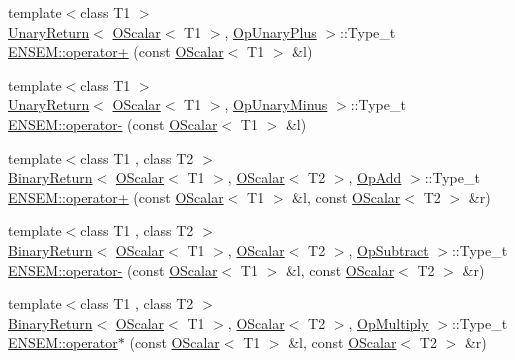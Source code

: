 \begin{DoxyCompactItemize}
\item 
{\footnotesize template$<$class T1 $>$ }\\\mbox{\hyperlink{structENSEM_1_1UnaryReturn}{Unary\+Return}}$<$ \mbox{\hyperlink{classENSEM_1_1OScalar}{O\+Scalar}}$<$ T1 $>$, \mbox{\hyperlink{structENSEM_1_1OpUnaryPlus}{Op\+Unary\+Plus}} $>$\+::Type\+\_\+t \mbox{\hyperlink{group__obsscalar_gac4378d2fcdd1b512f26ca8549d533809}{E\+N\+S\+E\+M\+::operator+}} (const \mbox{\hyperlink{classENSEM_1_1OScalar}{O\+Scalar}}$<$ T1 $>$ \&l)
\item 
{\footnotesize template$<$class T1 $>$ }\\\mbox{\hyperlink{structENSEM_1_1UnaryReturn}{Unary\+Return}}$<$ \mbox{\hyperlink{classENSEM_1_1OScalar}{O\+Scalar}}$<$ T1 $>$, \mbox{\hyperlink{structENSEM_1_1OpUnaryMinus}{Op\+Unary\+Minus}} $>$\+::Type\+\_\+t \mbox{\hyperlink{group__obsscalar_ga4bd7642a04321b074e1d5a47a9e195e4}{E\+N\+S\+E\+M\+::operator-\/}} (const \mbox{\hyperlink{classENSEM_1_1OScalar}{O\+Scalar}}$<$ T1 $>$ \&l)
\item 
{\footnotesize template$<$class T1 , class T2 $>$ }\\\mbox{\hyperlink{structENSEM_1_1BinaryReturn}{Binary\+Return}}$<$ \mbox{\hyperlink{classENSEM_1_1OScalar}{O\+Scalar}}$<$ T1 $>$, \mbox{\hyperlink{classENSEM_1_1OScalar}{O\+Scalar}}$<$ T2 $>$, \mbox{\hyperlink{structENSEM_1_1OpAdd}{Op\+Add}} $>$\+::Type\+\_\+t \mbox{\hyperlink{group__obsscalar_gad9d349126080f8e62b28694075f5dd8d}{E\+N\+S\+E\+M\+::operator+}} (const \mbox{\hyperlink{classENSEM_1_1OScalar}{O\+Scalar}}$<$ T1 $>$ \&l, const \mbox{\hyperlink{classENSEM_1_1OScalar}{O\+Scalar}}$<$ T2 $>$ \&r)
\item 
{\footnotesize template$<$class T1 , class T2 $>$ }\\\mbox{\hyperlink{structENSEM_1_1BinaryReturn}{Binary\+Return}}$<$ \mbox{\hyperlink{classENSEM_1_1OScalar}{O\+Scalar}}$<$ T1 $>$, \mbox{\hyperlink{classENSEM_1_1OScalar}{O\+Scalar}}$<$ T2 $>$, \mbox{\hyperlink{structENSEM_1_1OpSubtract}{Op\+Subtract}} $>$\+::Type\+\_\+t \mbox{\hyperlink{group__obsscalar_gaf2bbff6744c4daa8183665c15f4052b4}{E\+N\+S\+E\+M\+::operator-\/}} (const \mbox{\hyperlink{classENSEM_1_1OScalar}{O\+Scalar}}$<$ T1 $>$ \&l, const \mbox{\hyperlink{classENSEM_1_1OScalar}{O\+Scalar}}$<$ T2 $>$ \&r)
\item 
{\footnotesize template$<$class T1 , class T2 $>$ }\\\mbox{\hyperlink{structENSEM_1_1BinaryReturn}{Binary\+Return}}$<$ \mbox{\hyperlink{classENSEM_1_1OScalar}{O\+Scalar}}$<$ T1 $>$, \mbox{\hyperlink{classENSEM_1_1OScalar}{O\+Scalar}}$<$ T2 $>$, \mbox{\hyperlink{structENSEM_1_1OpMultiply}{Op\+Multiply}} $>$\+::Type\+\_\+t \mbox{\hyperlink{group__obsscalar_gaa61093018ee3eb29e249efd26f29bbdd}{E\+N\+S\+E\+M\+::operator$\ast$}} (const \mbox{\hyperlink{classENSEM_1_1OScalar}{O\+Scalar}}$<$ T1 $>$ \&l, const \mbox{\hyperlink{classENSEM_1_1OScalar}{O\+Scalar}}$<$ T2 $>$ \&r)

\end{DoxyCompactItemize}
